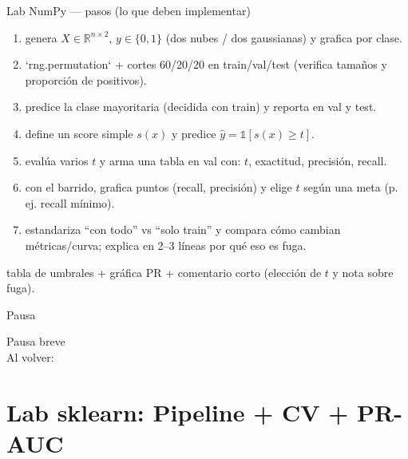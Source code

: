 \begin{frame}{Lab NumPy — pasos (lo que deben implementar)}

\footnotesize
\begin{enumerate}\setlength{\itemsep}{0.22em}
  \item {} genera \(X\in\mathbb{R}^{n\times 2}\), \(y\in\{0,1\}\) (dos nubes / dos gaussianas) y grafica por clase.
  \item {} `rng.permutation` + cortes 60/20/20 en train/val/test (verifica tamaños y proporción de positivos).
  \item {} predice la clase mayoritaria (decidida con train) y reporta  en val y test.
  \item {} define un score simple \(s(x)\) y predice \(\hat y=\mathbb{1}[s(x)\ge t]\).
  \item {} evalúa varios \(t\) y arma una tabla en val con: \(t\), exactitud, precisión, recall.
  \item {} con el barrido, grafica puntos (recall, precisión) y elige \(t\) según una meta (p. ej. recall mínimo).
  \item {} estandariza “con todo” vs “solo train” y compara cómo cambian métricas/curva; explica en 2–3 líneas por qué eso es fuga.
\end{enumerate}

\vspace{0.25em}
 tabla de umbrales + gráfica PR + comentario corto (elección de \(t\) y nota sobre fuga).
\end{frame}

\begin{frame}{Pausa}

\Large\centering
Pausa breve \\
\vspace{0.4em}
\normalsize
Al volver: 
\end{frame}

\section[Lab sklearn]{Lab sklearn: Pipeline + CV + PR-AUC}

